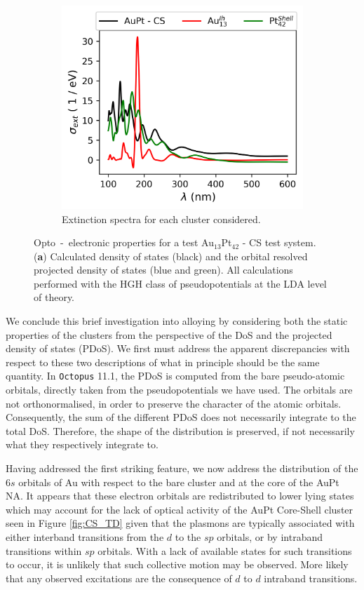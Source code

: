 \begin{figure}
\begin{subfigure}{0.45\textwidth}
        \includegraphics[width=\textwidth]{figures/LM/Atomistic/CS_CSV.png}
        \caption{Extinction spectra for each cluster considered.}
        \label{fig:CS_CSV}
    \end{subfigure}
    \caption{Opto~-~electronic properties for a test Au$_{13}$Pt$_{42}$ - CS test system. (\textbf{a}) Calculated density of states (black) and the orbital resolved projected density of states (blue and green). All calculations performed with the HGH class of pseudopotentials \cite{PhysRevB.58.3641} at the LDA level of theory.}
    \label{fig:DFT_CS}
\end{figure}

We conclude this brief investigation into alloying by considering both the static properties of the clusters from the perspective of the DoS and the projected density of states (PDoS). We first must address the apparent discrepancies with respect to these two descriptions of what in principle should be the same quantity. In \texttt{Octopus} 11.1, the PDoS is computed from the bare pseudo-atomic orbitals, directly taken from the pseudopotentials we have used. The orbitals are not orthonormalised, in order to preserve the character of the atomic orbitals. Consequently, the sum of the different PDoS does not necessarily integrate to the total DoS. Therefore, the shape of the distribution is preserved, if not necessarily what they respectively integrate to. 

Having addressed the first striking feature, we now address the distribution of the 6$s$ orbitals of Au with respect to the bare cluster and at the core of the AuPt NA. It appears that these electron orbitals are redistributed to lower lying states which may account for the lack of optical activity of the AuPt Core-Shell cluster seen in Figure \ref{fig:CS_TD} given that the plasmons are typically associated with either interband transitions from the $d$ to the $sp$ orbitals, or by intraband transitions within $sp$ orbitals. With a lack of available states for such transitions to occur, it is unlikely that such collective motion may be observed. More likely that any observed excitations are the consequence of $d$ to $d$ intraband transitions.

